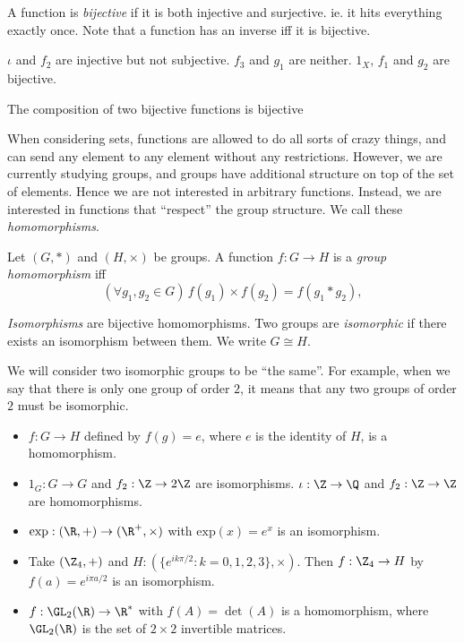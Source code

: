 \documentclass[a4paper]{article}
\begin{document}
\begin{defi}
  A function is \emph{bijective} if it is both injective and surjective. ie. it hits everything exactly once. Note that a function has an inverse iff it is bijective.
\end{defi}

\begin{eg}
  $\iota$ and $f_2$ are injective but not subjective. $f_3$ and $g_1$ are neither. $1_X$, $f_1$ and $g_2$ are bijective.
\end{eg}

\begin{lemma}
  The composition of two bijective functions is bijective
\end{lemma}

When considering sets, functions are allowed to do all sorts of crazy things, and can send any element to any element without any restrictions. However, we are currently studying groups, and groups have additional structure on top of the set of elements. Hence we are not interested in arbitrary functions. Instead, we are interested in functions that ``respect'' the group structure. We call these \emph{homomorphisms}.
\begin{defi}
  Let $(G, *)$ and $(H, \times)$ be groups. A function $f:G\rightarrow H$ is a \emph{group homomorphism} iff
  \[
   ( \forall g_1, g_2 \in G)\, f(g_1)\times f(g_2) = f(g_1 * g_2),
  \]
\end{defi}

\begin{defi}
  \emph{Isomorphisms} are bijective homomorphisms. Two groups are \emph{isomorphic} if there exists an isomorphism between them. We write $G\cong H$.
\end{defi}
We will consider two isomorphic groups to be ``the same''. For example, when we say that there is only one group of order $2$, it means that any two groups of order $2$ must be isomorphic.

\begin{eg}\leavevmode
  \begin{itemize}
    \item $f: G \to H$ defined by $f(g) = e$, where $e$ is the identity of $H$, is a homomorphism.
    \item $1_G: G \rightarrow G$ and $f_2: \Z \rightarrow 2\Z$ are isomorphisms. $\iota: \Z\rightarrow\Q$ and $f_2:\Z\rightarrow\Z$ are homomorphisms.
    \item $\mathrm{exp}: (\R, +) \rightarrow (\R^+, \times)$ with $\mathrm{exp}(x) = e^x$ is an isomorphism.
    \item Take $(\Z_4, +)$ and $H: (\{e^{ik\pi/2}:k=0, 1 ,2, 3\}, \times)$. Then $f: \Z_4 \rightarrow H$ by $f(a) = e^{i\pi a/2}$ is an isomorphism.
    \item $f: \GL_2(\R) \rightarrow \R^*$ with $f(A) = \det(A)$ is a homomorphism, where $\GL_2(\R)$ is the set of $2\times 2$ invertible matrices.
  \end{itemize}
\end{eg}
\end{document}
